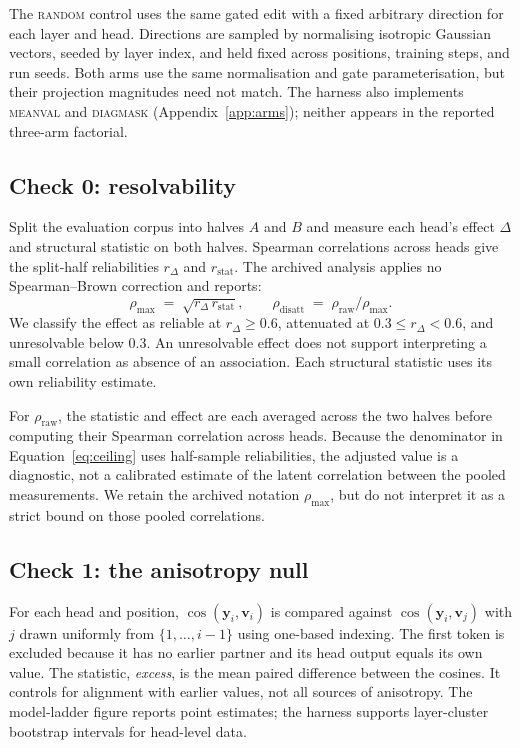\documentclass{article} %
\newcommand{\yv}{\mathbf{y}}
\begin{document}
The \textsc{random} control uses the same gated edit with a fixed arbitrary
direction for each layer and head. Directions are sampled by normalising
isotropic Gaussian vectors, seeded by layer index, and held fixed across
positions, training steps, and run seeds. Both arms use the same normalisation
and gate parameterisation, but their projection magnitudes need not match.
The harness also implements \textsc{meanval} and \textsc{diagmask}
(Appendix~\ref{app:arms}); neither appears in the reported three-arm factorial.

\subsection{Check 0: resolvability}

Split the evaluation corpus into halves $A$ and $B$ and measure each head's
effect $\Delta$ and structural statistic on both halves. Spearman
correlations across heads give the split-half reliabilities $r_\Delta$ and
$r_{\text{stat}}$. The archived analysis applies no Spearman--Brown
correction and reports:
\begin{equation}
\rho_{\max} \;=\; \sqrt{r_\Delta \, r_{\text{stat}}},
\qquad
\rho_{\text{disatt}} \;=\; \rho_{\text{raw}} / \rho_{\max}.
\label{eq:ceiling}
\end{equation}
We classify the effect as reliable at $r_\Delta \ge 0.6$, attenuated at
$0.3 \le r_\Delta < 0.6$, and unresolvable below $0.3$. An unresolvable
effect does not support interpreting a small correlation as absence of an
association. Each structural statistic uses its own reliability estimate.

For $\rho_{\text{raw}}$, the statistic and effect are each averaged across
the two halves before computing their Spearman correlation across heads.
Because the denominator in Equation~\ref{eq:ceiling} uses half-sample
reliabilities, the adjusted value is a diagnostic, not a calibrated estimate
of the latent correlation between the pooled measurements. We retain the
archived notation $\rho_{\max}$, but do not interpret it as a strict bound
on those pooled correlations.

\subsection{Check 1: the anisotropy null}

For each head and position, $\cos(\yv_i, \mathbf{v}_i)$ is compared against
$\cos(\yv_i, \mathbf{v}_j)$ with $j$ drawn uniformly from
$\{1,\dots,i-1\}$ using one-based indexing. The first token is excluded
because it has no earlier partner and its head output equals its own value.
The statistic, \emph{excess}, is the mean paired difference between the
cosines. It controls for alignment with earlier values, not all sources of
anisotropy. The model-ladder figure reports point estimates; the harness
supports layer-cluster bootstrap intervals for head-level data.
\end{document}

